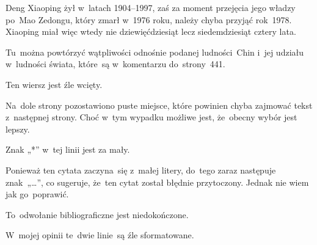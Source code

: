\documentclass[a4paper,11pt]{article}
\begin{document}
\VerSpaceFour





\noindent
{} Deng Xiaoping żył w~latach 1904--1997, zaś za moment
przejęcia jego władzy po~Mao Zedongu, który zmarł w~1976 roku, należy
chyba przyjąć rok~1978. Xiaoping miał więc wtedy nie dziewięćdziesiąt lecz
siedemdziesiąt cztery lata.

\VerSpaceFour





\noindent
{} Tu~można powtórzyć wątpliwości odnośnie podanej
ludności~Chin i~jej udziału w~ludności świata, które~są w~komentarzu
do~strony~441.

\VerSpaceFour





\noindent
{} Ten wiersz jest źle wcięty.

\VerSpaceFour





\noindent
{} Na~dole strony pozostawiono puste miejsce, które powinien chyba
zajmować tekst z~następnej strony. Choć w~tym wypadku możliwe jest,
że~obecny wybór jest lepszy.

\VerSpaceFour





\noindent
{} Znak „*” w~tej linii jest za mały.

\VerSpaceFour





\noindent
{} Ponieważ ten cytata zaczyna~się z~małej litery, do~tego
zaraz następuje znak~„\ldots”, co sugeruje, że~ten cytat został błędnie
przytoczony. Jednak nie wiem jak go~poprawić.

\VerSpaceFour





\noindent
{} To~odwołanie bibliograficzne jest niedokończone.

\VerSpaceFour





\noindent
{} W~mojej opinii te~dwie linie~są źle sformatowane.

\VerSpaceFour
\end{document}
